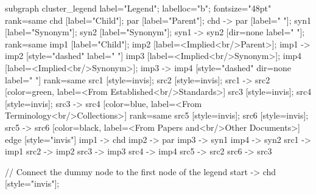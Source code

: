 \documentclass{article}
\begin{document}
{subgraph cluster_legend {
    label="Legend";
    labelloc="b";
    fontsize="48pt"
    {
        rank=same
        chd [label="Child"];
        par [label="Parent"];
        chd -> par [label="                "];
        syn1 [label="Synonym"];
        syn2 [label="Synonym"];
        syn1 -> syn2 [dir=none label="                "];
    }
    {
        rank=same
        imp1 [label="Child"];
        imp2 [label=<Implied<br/>Parent>];
        imp1 -> imp2 [style="dashed" label="                "]
        imp3 [label=<Implied<br/>Synonym>];
        imp4 [label=<Implied<br/>Synonym>];
        imp3 -> imp4 [style="dashed" dir=none label="                "]
    }
{
rank=same
src1 [style=invis];
src2 [style=invis];
src1 -> src2 [color=green, label=<From Established<br/>Standards>]
src3 [style=invis];
src4 [style=invis];
src3 -> src4 [color=blue, label=<From Terminology<br/>Collections>]
}
{
rank=same
src5 [style=invis];
src6 [style=invis];
src5 -> src6 [color=black, label=<From Papers and<br/>Other Documents>]
}
    edge [style="invis"]
    imp1 -> chd
    imp2 -> par
    imp3 -> syn1
    imp4 -> syn2
src1 -> imp1
src2 -> imp2
src3 -> imp3
src4 -> imp4
src5 -> src2
src6 -> src3
}

// Connect the dummy node to the first node of the legend
start -> chd [style="invis"];
}
\end{document}
